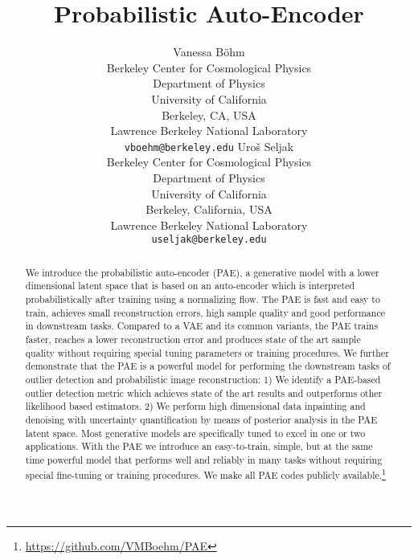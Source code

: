 \documentclass{article}
\title{Probabilistic Auto-Encoder}
\author{Vanessa B\"ohm\\Berkeley Center for Cosmological Physics\\
    Department of Physics\\
    University of California\\
    Berkeley, CA, USA\\
    Lawrence Berkeley National Laboratory\\
\texttt{vboehm@berkeley.edu}
\And
  Uro\v s Seljak\\
  Berkeley Center for Cosmological Physics\\
  Department of Physics\\
University of California\\
  Berkeley, California, USA\\
  Lawrence Berkeley National Laboratory\\
\texttt{useljak@berkeley.edu} \\
}
\begin{document}
\maketitle

\begin{abstract}
We introduce the probabilistic auto-encoder (PAE), a generative model with a lower dimensional latent space that is based on an auto-encoder which is interpreted probabilistically after training using a normalizing flow. The PAE is fast and easy to train, achieves small reconstruction errors, high sample quality and good performance in downstream tasks. Compared to a VAE and its common variants, the PAE trains faster, reaches a lower reconstruction error and produces state of the art sample quality without requiring special tuning parameters or training procedures. We further demonstrate that the PAE is a powerful model for performing the downstream tasks of outlier detection and probabilistic image reconstruction: 1) We identify a PAE-based outlier detection metric which achieves state of the art results and outperforms other likelihood based estimators. 2) We perform high dimensional data inpainting and denoising with uncertainty quantification by means of posterior analysis in the PAE latent space. Most generative models are specifically tuned to excel in one or two applications. With the PAE we introduce an easy-to-train, simple, but at the same time powerful model that performs well and reliably in many tasks without requiring special fine-tuning or training procedures. We make all PAE codes publicly available.\footnote{\url{https://github.com/VMBoehm/PAE}}
\end{abstract}
\end{document}
